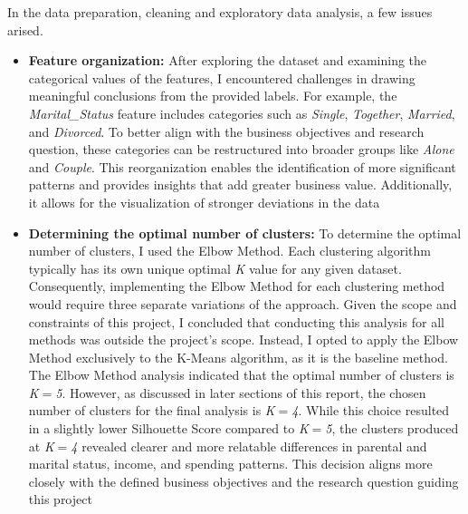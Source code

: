 \documentclass[11pt]{article}
\begin{document}
In the data preparation, cleaning and exploratory data analysis, a few issues arised.

\vspace{1\baselineskip}
\begin{itemize}
	\item \textbf{Feature organization:} After exploring the dataset and examining the categorical values of the features, I encountered challenges in drawing meaningful conclusions from the provided labels. For example, the \textit{Marital\_Status} feature includes categories such as \textit{Single}, \textit{Together}, \textit{Married}, and \textit{Divorced}. To better align with the business objectives and research question, these categories can be restructured into broader groups like \textit{Alone} and \textit{Couple}. This reorganization enables the identification of more significant patterns and provides insights that add greater business value. Additionally, it allows for the visualization of stronger deviations in the data

\end{itemize}
\vspace{1\baselineskip}
\begin{itemize}
	\item \textbf{Determining the optimal number of clusters:} To determine the optimal number of clusters, I used the Elbow Method. Each clustering algorithm typically has its own unique optimal \textit{K} value for any given dataset. Consequently, implementing the Elbow Method for each clustering method would require three separate variations of the approach. Given the scope and constraints of this project, I concluded that conducting this analysis for all methods was outside the project's scope. Instead, I opted to apply the Elbow Method exclusively to the K-Means algorithm, as it is the baseline method. The Elbow Method analysis indicated that the optimal number of clusters is \textit{K$=$5}. However, as discussed in later sections of this report, the chosen number of clusters for the final analysis is \textit{K$=$4}. While this choice resulted in a slightly lower Silhouette Score compared to \textit{K$=$5}, the clusters produced at \textit{K$=$4} revealed clearer and more relatable differences in parental and marital status, income, and spending patterns. This decision aligns more closely with the defined business objectives and the research question guiding this project

\end{itemize}
\vspace{1\baselineskip}
\end{document}
